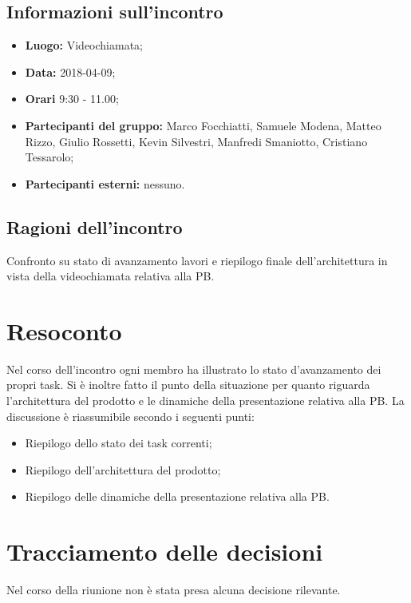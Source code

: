 \documentclass[openany,12pt,a4paper]{article}
\begin{document}
  \subsection{Informazioni sull'incontro} 
   
  \begin{itemize}  
      \item \textbf{Luogo:} Videochiamata;
      \item \textbf{Data:} 2018-04-09; 
      \item \textbf{Orari} 9:30 - 11.00;
      \item \textbf{Partecipanti del gruppo:} Marco Focchiatti, Samuele Modena, Matteo Rizzo, Giulio Rossetti, Kevin Silvestri, Manfredi Smaniotto, Cristiano Tessarolo;  
      \item \textbf{Partecipanti esterni:} nessuno. 
  \end{itemize} 
 
  \subsection{Ragioni dell'incontro} 
  Confronto su stato di avanzamento lavori e riepilogo finale dell'architettura in vista della videochiamata relativa alla PB.
 
  \section{Resoconto} 
  Nel corso dell'incontro ogni membro ha illustrato lo stato d'avanzamento dei propri task. Si è inoltre fatto il punto della situazione per quanto riguarda l'architettura del prodotto e le dinamiche della presentazione relativa alla PB. La discussione è riassumibile secondo i seguenti punti:   
	
  \begin{itemize}
	\item Riepilogo dello stato dei task correnti;
	\item Riepilogo dell'architettura del prodotto;
	\item Riepilogo delle dinamiche della presentazione relativa alla PB.
  \end{itemize}

  \section{Tracciamento delle decisioni} 
   
  Nel corso della riunione non è stata presa alcuna decisione rilevante.
  
  
\end{document}
